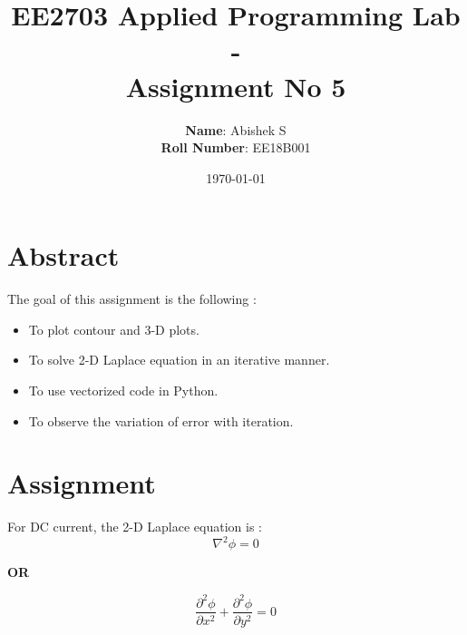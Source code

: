 \documentclass[11pt, a4paper]{article}
\title{EE2703 Applied Programming Lab - \\Assignment No 5}
\author{
  \textbf{Name}: Abishek S\\
  \textbf{Roll Number}: EE18B001
}\date{\today}
\begin{document}
		
\maketitle 
\section{Abstract}
The goal of this assignment is the following :
\begin{itemize}
\item To plot contour and 3-D plots.
\item To solve 2-D Laplace equation in an iterative manner.
\item To use vectorized code in Python.
\item To observe the variation of error with iteration.
\end{itemize}

\section{Assignment}
For DC current, the 2-D Laplace equation is :
\begin{equation}\label{eq:1}
\nabla^2\phi = 0
\end{equation}
\begin{center}
\textbf{OR}
\end{center}
\begin{equation}\label{eq:2}
\frac{\partial^2\phi}{\partial x^2} + \frac{\partial^2\phi}{\partial y^2} = 0
\end{equation}
\\
\end{document}
